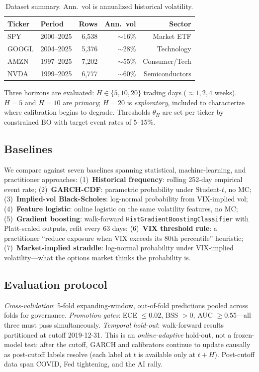 \documentclass[11pt,a4paper]{article}
\begin{document}
\begin{table}[htbp]
\centering
\small
\caption{Dataset summary. Ann.\ vol is annualized historical volatility.}
\label{tab:data}
\begin{tabular}{llrrr}
\toprule
Ticker & Period & Rows & Ann.\ vol & Sector \\
\midrule
SPY   & 2000--2025 & 6,538 & $\sim$16\% & Market ETF \\
GOOGL & 2004--2025 & 5,376 & $\sim$28\% & Technology \\
AMZN  & 1997--2025 & 7,202 & $\sim$55\% & Consumer/Tech \\
NVDA  & 1999--2025 & 6,777 & $\sim$60\% & Semiconductors \\
\bottomrule
\end{tabular}
\end{table}

Three horizons are evaluated: $H \in \{5, 10, 20\}$ trading days ($\approx 1, 2, 4$ weeks). $H\!=\!5$ and $H\!=\!10$ are \emph{primary}; $H\!=\!20$ is \emph{exploratory}, included to characterize where calibration begins to degrade. Thresholds $\theta_H$ are set per ticker by constrained BO with target event rates of 5--15\%.

\subsection{Baselines}

We compare against seven baselines spanning statistical, machine-learning, and practitioner approaches:
(1)~\textbf{Historical frequency}: rolling 252-day empirical event rate;
(2)~\textbf{GARCH-CDF}: parametric probability under Student-$t$, no MC;
(3)~\textbf{Implied-vol Black-Scholes}: log-normal probability from VIX-implied vol;
(4)~\textbf{Feature logistic}: online logistic on the same volatility features, no MC;
(5)~\textbf{Gradient boosting}: walk-forward \texttt{HistGradientBoostingClassifier} \cite{friedman2001greedy} with Platt-scaled outputs, refit every 63 days;
(6)~\textbf{VIX threshold rule}: a practitioner ``reduce exposure when VIX exceeds its 80th percentile'' heuristic;
(7)~\textbf{Market-implied straddle}: log-normal probability under VIX-implied volatility---what the options market thinks the probability is.

\subsection{Evaluation protocol}

\emph{Cross-validation}: 5-fold expanding-window, out-of-fold predictions pooled across folds for governance.
\emph{Promotion gates}: ECE $\leq 0.02$, BSS $> 0$, AUC $\geq 0.55$---all three must pass simultaneously.
\emph{Temporal hold-out}: walk-forward results partitioned at cutoff 2019-12-31. This is an \emph{online-adaptive} hold-out, not a frozen-model test: after the cutoff, GARCH and calibrators continue to update causally as post-cutoff labels resolve (each label at $t$ is available only at $t+H$). Post-cutoff data span COVID, Fed tightening, and the AI rally.
\end{document}
